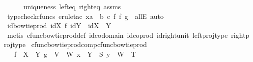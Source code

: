 \begin{isabellebody}
\ \ \ \ \isamarkupfalse%
\ uniqueness\ left{\isacharunderscore}{\kern0pt}eq\ right{\isacharunderscore}{\kern0pt}eq\ assms\isanewline
\ \ \ \ \isamarkupfalse%
\ {\isacharparenleft}{\kern0pt}typecheck{\isacharunderscore}{\kern0pt}cfuncs{\isacharcomma}{\kern0pt}\ erule{\isacharunderscore}{\kern0pt}tac\ x{\isacharequal}{\kern0pt}{\isachardoublequoteopen}{\isacharparenleft}{\kern0pt}a\ {\isasymamalg}\ b{\isacharparenright}{\kern0pt}\ {\isasymcirc}\isactrlsub c\ {\isacharparenleft}{\kern0pt}f\ {\isasymbowtie}\isactrlsub f\ g{\isacharparenright}{\kern0pt}{\isachardoublequoteclose}\ \ allE{\isacharcomma}{\kern0pt}\ auto{\isacharparenright}{\kern0pt}\isanewline
{}\isamarkupfalse%
%
\endisatagproof
{\isafoldproof}%
%
\isadelimproof
\isanewline
%
\endisadelimproof
\isanewline
{}\isamarkupfalse%
\ id{\isacharunderscore}{\kern0pt}bowtie{\isacharunderscore}{\kern0pt}prod{\isacharcolon}{\kern0pt}\ {\isachardoublequoteopen}id{\isacharparenleft}{\kern0pt}X{\isacharparenright}{\kern0pt}\ {\isasymbowtie}\isactrlsub f\ id{\isacharparenleft}{\kern0pt}Y{\isacharparenright}{\kern0pt}\ {\isacharequal}{\kern0pt}\ id{\isacharparenleft}{\kern0pt}X\ {\isasymCoprod}\ Y{\isacharparenright}{\kern0pt}{\isachardoublequoteclose}\isanewline
%
\isadelimproof
\ \ %
\endisadelimproof
%
\isatagproof
{}\isamarkupfalse%
\ {\isacharparenleft}{\kern0pt}metis\ cfunc{\isacharunderscore}{\kern0pt}bowtie{\isacharunderscore}{\kern0pt}prod{\isacharunderscore}{\kern0pt}def\ id{\isacharunderscore}{\kern0pt}codomain\ id{\isacharunderscore}{\kern0pt}coprod\ id{\isacharunderscore}{\kern0pt}right{\isacharunderscore}{\kern0pt}unit{}\ left{\isacharunderscore}{\kern0pt}proj{\isacharunderscore}{\kern0pt}type\ right{\isacharunderscore}{\kern0pt}proj{\isacharunderscore}{\kern0pt}type{\isacharparenright}{\kern0pt}%
\endisatagproof
{\isafoldproof}%
%
\isadelimproof
\isanewline
%
\endisadelimproof
\isanewline
{}\isamarkupfalse%
\ cfunc{\isacharunderscore}{\kern0pt}bowtie{\isacharunderscore}{\kern0pt}prod{\isacharunderscore}{\kern0pt}comp{\isacharunderscore}{\kern0pt}cfunc{\isacharunderscore}{\kern0pt}bowtie{\isacharunderscore}{\kern0pt}prod{\isacharcolon}{\kern0pt}\isanewline
\ \ \ {\isachardoublequoteopen}f\ {\isacharcolon}{\kern0pt}\ X\ {\isasymrightarrow}\ Y{\isachardoublequoteclose}\ {\isachardoublequoteopen}g\ {\isacharcolon}{\kern0pt}\ V\ {\isasymrightarrow}\ W{\isachardoublequoteclose}\ {\isachardoublequoteopen}x\ {\isacharcolon}{\kern0pt}\ Y\ {\isasymrightarrow}\ S{\isachardoublequoteclose}\ {\isachardoublequoteopen}y\ {\isacharcolon}{\kern0pt}\ W\ {\isasymrightarrow}\ T{\isachardoublequoteclose}\isanewline

\end{isabellebody}
